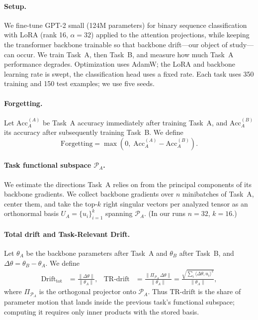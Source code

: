 \documentclass[11pt]{article}
\newcommand{\trdrift}{\mathrm{TR\text{-}drift}}
\newcommand{\totaldrift}{\mathrm{Drift}_{\mathrm{tot}}}
\newcommand{\PA}{\mathcal{P}_A}
\begin{document}
\paragraph{Setup.}
We fine-tune GPT-2 small (124M parameters) for binary sequence classification
with LoRA (rank 16, $\alpha=32$) applied to the attention projections, while
keeping the transformer backbone trainable so that backbone drift---our object
of study---can occur. We train Task~A, then Task~B, and measure how much Task~A
performance degrades. Optimization uses AdamW; the LoRA and backbone learning
rate is swept, the classification head uses a fixed rate. Each task uses 350
training and 150 test examples; we use five seeds.

\paragraph{Forgetting.}
Let $\mathrm{Acc}_A^{(A)}$ be Task~A accuracy immediately after training Task~A,
and $\mathrm{Acc}_A^{(B)}$ its accuracy after subsequently training Task~B. We
define
\begin{equation}
\mathrm{Forgetting} = \max\!\left(0,\; \mathrm{Acc}_A^{(A)} - \mathrm{Acc}_A^{(B)}\right).
\end{equation}

\paragraph{Task functional subspace $\PA$.}
We estimate the directions Task~A relies on from the principal components of its
backbone gradients. We collect backbone gradients over $n$ minibatches of
Task~A, center them, and take the top-$k$ right singular vectors per analyzed
tensor as an orthonormal basis $U_A=\{u_i\}_{i=1}^k$ spanning $\PA$. (In our
runs $n=32$, $k=16$.)

\paragraph{Total drift and Task-Relevant Drift.}
Let $\theta_A$ be the backbone parameters after Task~A and $\theta_B$ after
Task~B, and $\Delta\theta=\theta_B-\theta_A$. We define
\begin{align}
\totaldrift &= \frac{\lVert \Delta\theta \rVert}{\lVert \theta_A \rVert}, &
\trdrift &= \frac{\lVert \Pi_{\PA}\,\Delta\theta \rVert}{\lVert \theta_A \rVert}
= \frac{\sqrt{\sum_i \langle \Delta\theta, u_i\rangle^2}}{\lVert \theta_A \rVert},
\end{align}
where $\Pi_{\PA}$ is the orthogonal projector onto $\PA$. Thus $\trdrift$ is the
share of parameter motion that lands inside the previous task's functional
subspace; computing it requires only inner products with the stored basis.
\end{document}
